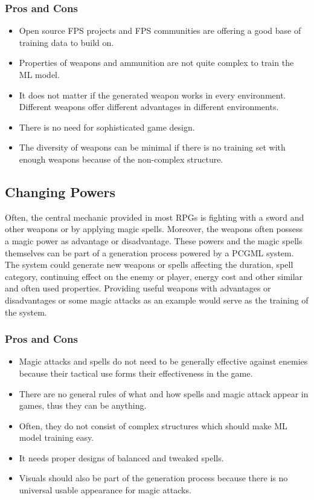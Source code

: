 \documentclass[MGS,Master,english]{twbook}%
\begin{document}
\subsubsection{Pros and Cons}
\begin{itemize}
	\item Open source \ac{FPS} projects and \ac{FPS} communities are offering a good base of training data to build on.
	\item Properties of weapons and ammunition are not quite complex to train the \ac{ML} model.
	\item It does not matter if the generated weapon works in every environment. Different weapons offer different advantages in different environments.
	\item There is no need for sophisticated game design.
	\item The diversity of weapons can be minimal if there is no training set with enough weapons because of the non-complex structure.
\end{itemize}

\subsection{Changing Powers} \label{idea::changingPowers}
Often, the central mechanic provided in most \acp{RPG} is fighting with a sword and other weapons or by applying magic spells. Moreover, the weapons often possess a magic power as advantage or disadvantage. These powers and the magic spells themselves can be part of a generation process powered by a \ac{PCGML} system. The system could generate new weapons or spells affecting the duration, spell category, continuing effect on the enemy or player, energy cost and other similar and often used properties. Providing useful weapons with advantages or disadvantages or some magic attacks as an example would serve as the training of the system.

\subsubsection{Pros and Cons}
\begin{itemize}
	\item Magic attacks and spells do not need to be generally effective against enemies because their tactical use forms their effectiveness in the game.
	\item There are no general rules of what and how spells and magic attack appear in games, thus they can be anything.
	\item Often, they do not consist of complex structures which should make \ac{ML} model training easy.
	\item It needs proper designs of balanced and tweaked spells.
	\item Visuals should also be part of the generation process because there is no universal usable appearance for magic attacks.
\end{itemize}
\end{document}
